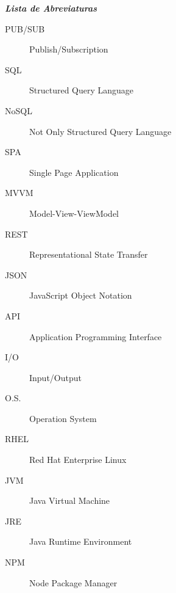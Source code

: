 \documentclass[brazil,ruledheader]{abntifes}
\begin{document}
	\listoftables
	
	\newpage
	
	\vfill 
	\null
	\begin{center}
		{\Huge {\bfseries\itshape Lista de Abreviaturas}}\\[3cm]
	\end{center}
	
	\begin{espacoduplo}
		\begin{description}
			\item[PUB/SUB] Publish/Subscription
			\item[SQL] Structured Query Language
			\item[NoSQL] Not Only Structured Query Language
			\item[SPA] Single Page Application
			\item[MVVM] Model-View-ViewModel
			\item[REST] Representational State Transfer
			\item[JSON] JavaScript Object Notation
			\item[API] Application Programming Interface
			\item[I/O] Input/Output
			\item[O.S.] Operation System
			\item[RHEL] Red Hat Enterprise Linux
			\item[JVM] Java Virtual Machine
			\item[JRE] Java Runtime Environment
			\item[NPM] Node Package Manager
		\end{description}
	\end{espacoduplo}
	
	\tableofcontents{}
	
	
	
	
	
	
	
	
	
	
	
	
\end{document}
